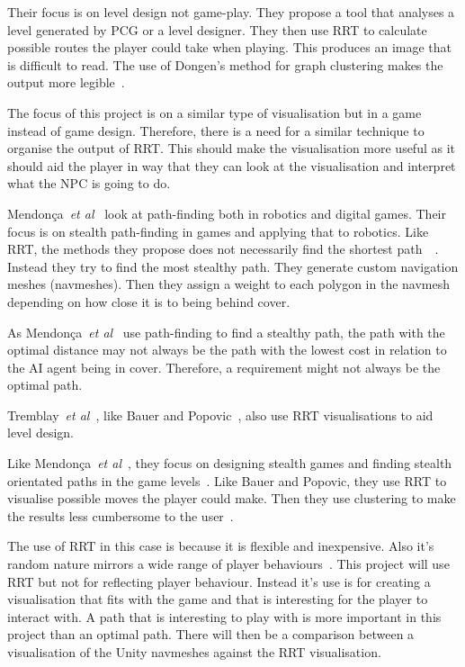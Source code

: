 \documentclass[journal]{IEEEtran}
\begin{document}
Their focus is on level design not game-play. They propose a tool that analyses a level generated by PCG or a level designer. They then use RRT to calculate possible routes the player could take when playing.  
This produces an image that is difficult to read. The use of Dongen's method for graph clustering makes the output more legible~\cite{bauer2012, van2001}.  

The focus of this project is on a similar type of  visualisation but in a game instead of game design. Therefore, there is a need for a similar technique to organise the output of RRT.  This should make the visualisation  more useful as it should aid the player in way that they can look at the visualisation and interpret what the NPC is going to do. 


Mendonça~\textit{et al}~\cite{Mendonça2015} look at path-finding both in robotics and digital games. Their focus is on stealth path-finding in games and applying that to robotics. Like RRT, the methods they propose does not necessarily find the shortest path~\cite{karaman2010}~\cite{Mendonça2015}. Instead they try to find the most stealthy path. They generate custom navigation meshes (navmeshes). Then they assign a weight to each polygon in the navmesh depending on how close it is to being behind cover. 

As Mendonça~\textit{et al}~\cite{Mendonça2015} use path-finding to find a stealthy path, the path with the optimal distance may not always be the path with the lowest cost in relation to the AI agent being in cover. Therefore, a requirement might not always be the optimal path. 

Tremblay~\textit{et al}~\cite{Tremblay2013}, like Bauer and Popovic~\cite{bauer2012}, also use RRT visualisations to aid level design. 

Like Mendonça~\textit{et al}~\cite{Mendonça2015}, they focus on designing stealth games and finding stealth orientated paths in the game levels~\cite{Tremblay2013}. Like Bauer and Popovic, they use RRT to visualise possible moves the player could make. Then they use clustering to make the results less cumbersome to the user~\cite{Tremblay2013}. 

The use of RRT in this case is because it is flexible and inexpensive. Also it's random nature mirrors a wide range of player behaviours~\cite{Tremblay2013}. 
This project will use RRT but not for reflecting player behaviour.  Instead it's use  is for creating a visualisation that fits with the game and that is interesting for the player to interact with. A path that is interesting to play with is more important in this project than an optimal path. There will then be a comparison between a visualisation of the Unity navmeshes against the RRT visualisation.
\end{document}
